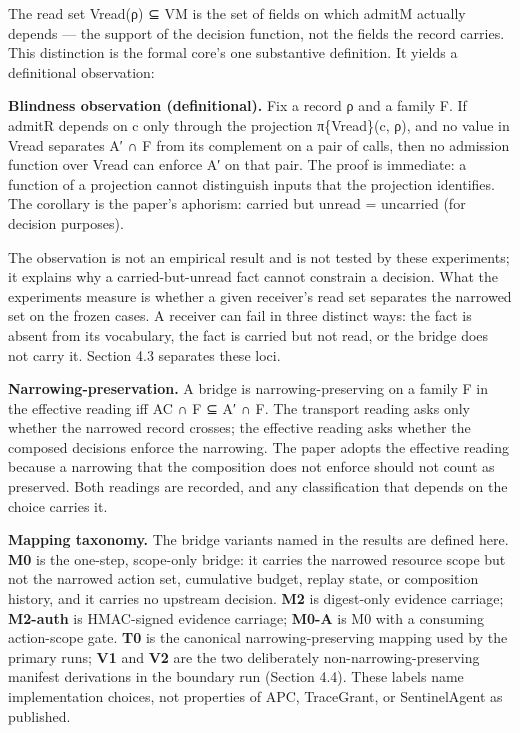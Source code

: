 \documentclass[
  10pt,
]{article}
\renewcommand{\_}{\allowbreak\origunderscore}
\begin{document}
The read set V\_read(ρ) ⊆ V\_M is the set of fields on which admit\_M
actually depends --- the support of the decision function, not the
fields the record carries. This distinction is the formal core's one
substantive definition. It yields a definitional observation:

\textbf{Blindness observation (definitional).} Fix a record ρ and a
family F. If admit\_R depends on c only through the projection
π\_\{V\_read\}(c, ρ), and no value in V\_read separates A′ ∩ F from its
complement on a pair of calls, then no admission function over V\_read
can enforce A′ on that pair. The proof is immediate: a function of a
projection cannot distinguish inputs that the projection identifies. The
corollary is the paper's aphorism: carried but unread = uncarried (for
decision purposes).

The observation is not an empirical result and is not tested by these
experiments; it explains why a carried-but-unread fact cannot constrain
a decision. What the experiments measure is whether a given receiver's
read set separates the narrowed set on the frozen cases. A receiver can
fail in three distinct ways: the fact is absent from its vocabulary, the
fact is carried but not read, or the bridge does not carry it. Section
4.3 separates these loci.

\textbf{Narrowing-preservation.} A bridge is narrowing-preserving on a
family F in the effective reading iff A\_C ∩ F ⊆ A′ ∩ F. The transport
reading asks only whether the narrowed record crosses; the effective
reading asks whether the composed decisions enforce the narrowing. The
paper adopts the effective reading because a narrowing that the
composition does not enforce should not count as preserved. Both
readings are recorded, and any classification that depends on the choice
carries it.

\textbf{Mapping taxonomy.} The bridge variants named in the results are
defined here. \textbf{M0} is the one-step, scope-only bridge: it carries
the narrowed resource scope but not the narrowed action set, cumulative
budget, replay state, or composition history, and it carries no upstream
decision. \textbf{M2} is digest-only evidence carriage; \textbf{M2-auth}
is HMAC-signed evidence carriage; \textbf{M0-A} is M0 with a consuming
action-scope gate. \textbf{T0} is the canonical narrowing-preserving
mapping used by the primary runs; \textbf{V1} and \textbf{V2} are the
two deliberately non-narrowing-preserving manifest derivations in the
boundary run (Section 4.4). These labels name implementation choices,
not properties of APC, TraceGrant, or SentinelAgent as published.
\end{document}
